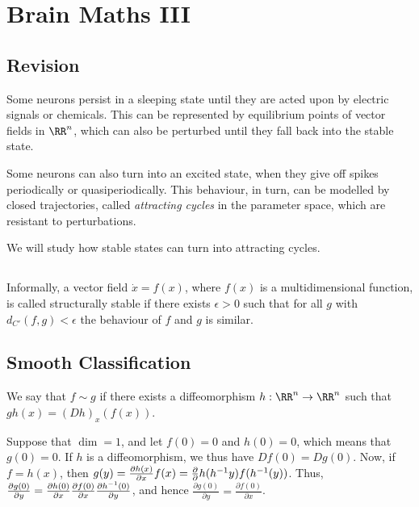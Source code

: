 \documentclass[11pt]{scrartcl}
\begin{document}
  \section{Brain Maths III}

  \subsection{Revision}

  Some neurons persist in a sleeping state until they are acted upon
  by electric signals or chemicals. This can be represented by
  equilibrium points of vector fields in $\RR^{n}$, which can also be
  perturbed until they fall back into the stable state.

  Some neurons can also turn into an excited state, when they give off
  spikes periodically or quasiperiodically. This behaviour, in turn,
  can be modelled by closed trajectories, called \textit{attracting
    cycles} in the parameter space, which are resistant to
  perturbations.

  We will study how stable states can turn into attracting cycles.

  \subsection{}

  Informally, a vector field $\dot{x} = f(x)$, where $f(x)$ is a
  multidimensional function, is called structurally stable if there
  exists $\epsilon > 0$ such that for all $g$ with
  $d_{C'}(f, g) < \epsilon$ the behaviour of $f$ and $g$ is similar.

  \subsection{Smooth Classification}

  We say that $f\sim g$ if there exists a diffeomorphism
  $h: \RR^{n} \to \RR^{n}$ such that $gh(x) = (Dh)_{x}(f(x))$.

  \begin{example}

    Suppose that $\dim = 1$, and let $f(0) = 0$ and $h(0) = 0$, which
    means that $g(0) = 0$. If $h$ is a diffeomorphism, we thus have
    $Df(0) = Dg(0)$. Now, if $f = h(x)$, then
    $g(y) = \frac{\partial h(x)}{\partial x} \* f(x) = \frac{\partial
    }{\partial}h(h^{-1}y)\*f(h^{-1}(y))$. Thus,
    $\frac{\partial g(0)}{\partial y} = \frac{\partial h(0)}{\partial
      x} \* \frac{\partial f(0)}{\partial x}\* \frac{\partial
      h^{-1}(0)}{\partial y}$, and hence
    $\frac{\partial g(0)}{\partial y} = \frac{\partial f(0)}{\partial
      x}$.

  \end{example}
\end{document}
